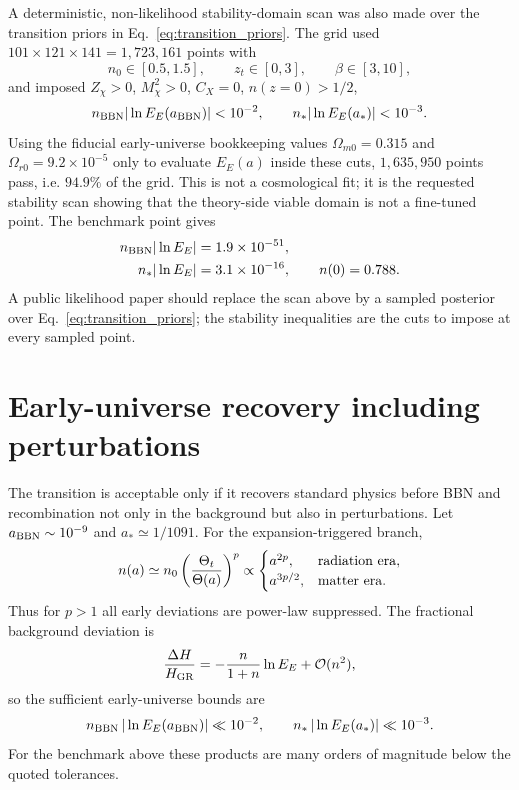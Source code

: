 \documentclass[aps,prd,reprint,nofootinbib,superscriptaddress,longbibliography]{revtex4-2}
\begin{document}
A deterministic, non-likelihood stability-domain scan was also made over the transition priors in Eq.~\eqref{eq:transition_priors}.  The grid used $101\times121\times141=1,723,161$ points with
\begin{equation}
  n_0\in[0.5,1.5],\qquad z_t\in[0,3],\qquad \beta\in[3,10],
  \label{eq:scan_grid}
\end{equation}
and imposed $Z_\chi>0$, $M_\chi^2>0$, $C_X=0$, $n(z=0)>1/2$,
\begin{equation}
  n_{\rm BBN}|\ln E_E(a_{\rm BBN})|<10^{-2},\qquad
  n_*|\ln E_E(a_*)|<10^{-3}.
  \label{eq:scan_cuts}
\end{equation}
Using the fiducial early-universe bookkeeping values $\Omega_{m0}=0.315$ and $\Omega_{r0}=9.2\times10^{-5}$ only to evaluate $E_E(a)$ inside these cuts, $1,635,950$ points pass, i.e. $94.9\%$ of the grid.  This is not a cosmological fit; it is the requested stability scan showing that the theory-side viable domain is not a fine-tuned point.  The benchmark point gives
\begin{align}
  n_{\rm BBN}|\ln E_E|&=1.9\times10^{-51},\nonumber\\
  n_*|\ln E_E|&=3.1\times10^{-16},
  \qquad n(0)=0.788 .
  \label{eq:benchmark_scan_values}
\end{align}
A public likelihood paper should replace the scan above by a sampled posterior over Eq.~\eqref{eq:transition_priors}; the stability inequalities are the cuts to impose at every sampled point.

\section{Early-universe recovery including perturbations}
\label{sec:early_universe_completion}

The transition is acceptable only if it recovers standard physics before BBN and recombination not only in the background but also in perturbations.  Let $a_{\rm BBN}\sim10^{-9}$ and $a_*\simeq1/1091$.  For the expansion-triggered branch,
\begin{equation}
  n(a)\simeq n_0\left(\frac{\Theta_t}{\Theta(a)}\right)^p
  \propto
  \begin{cases}
  a^{2p}, & \hbox{radiation era},\\
  a^{3p/2}, & \hbox{matter era}.
  \end{cases}
  \label{eq:early_scaling_n}
\end{equation}
Thus for $p>1$ all early deviations are power-law suppressed.  The fractional background deviation is
\begin{equation}
  \frac{\Delta H}{H_{\rm GR}}
  =-\frac{n}{1+n}\ln E_E
  +\mathcal O(n^2),
  \label{eq:early_H_deviation}
\end{equation}
so the sufficient early-universe bounds are
\begin{equation}
  n_{\rm BBN}\,|\ln E_E(a_{\rm BBN})|\ll 10^{-2},
  \qquad
  n_*\,|\ln E_E(a_*)|\ll 10^{-3} .
  \label{eq:early_bounds}
\end{equation}
For the benchmark above these products are many orders of magnitude below the quoted tolerances.
\end{document}
